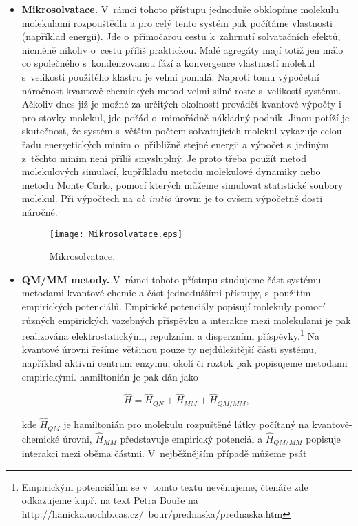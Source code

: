 \begin{itemize}

\item \textbf{Mikrosolvatace.} V~rámci tohoto přístupu jednoduše obklopíme molekulu molekulami rozpouštědla a pro celý tento systém pak počítáme vlastnosti (například energii). Jde o~přímočarou cestu k~zahrnutí solvatačních efektů, nicméně nikoliv o~cestu příliš praktickou. Malé agregáty mají totiž jen málo co společného s~kondenzovanou fází a konvergence vlastností molekul s~velikosti použitého klastru je velmi pomalá. Naproti tomu výpočetní náročnost kvantově-chemických metod velmi silně roste s~velikostí systému. Ačkoliv dnes již je možné za určitých okolností provádět kvantové výpočty i pro stovky molekul, jde pořád o~mimořádně nákladný podnik. Jinou potíží je skutečnost, že systém s~větším počtem solvatujících molekul vykazuje celou řadu energetických minim o~přibližně stejné energii a výpočet s~jediným z~těchto minim není příliš smysluplný. Je proto třeba použít metod molekulových simulací, kupříkladu metodu molekulové dynamiky nebo metodu Monte Carlo, pomocí kterých můžeme simulovat statistické soubory molekul. Při výpočtech na \textit{ab initio} úrovni je to ovšem výpočetně dosti náročné.

\begin{figure} [htb]
\centering
\texttt{[image: Mikrosolvatace.eps]}
\caption{Mikrosolvatace.}
\label{Mikrosolvatace}
\end{figure}

\item \textbf{QM/MM metody.} V~rámci tohoto přístupu studujeme část systému metodami kvantové chemie a část jednoduššími přístupy, s~použitím empirických potenciálů. Empirické potenciály popisují molekuly pomocí různých empirických vazebných příspěvku a interakce mezi molekulami je pak realizována elektrostatickými, repulzními a disperzními příspěvky.\footnote{Empirickým potenciálům se v~tomto textu nevěnujeme, čtenáře zde odkazujeme kupř. na text Petra Bouře na http://hanicka.uochb.cas.cz/~bour/prednaska/prednaska.htm}  Na kvantové úrovni řešíme většinou pouze ty nejdůležitější části systému, například aktivní centrum enzymu, okolí či roztok pak popisujeme metodami empirickými. hamiltonián je pak dán jako


\begin{equation}
\hat{H} = \hat{H}_{QN} + \hat{H}_{MM} + \hat{H}_{QM/MM},
\label{rov:Sol-1}
\end{equation}

\noindent kde $\hat{H}_{QM}$ je hamiltonián pro molekulu rozpuštěné látky počítaný na kvantově-chemické úrovni, $\hat{H}_{MM}$ představuje empirický potenciál a $\hat{H}_{QM/MM}$ popisuje interakci mezi oběma částmi. V~nejběžnějším případě můžeme psát


\end{itemize}
